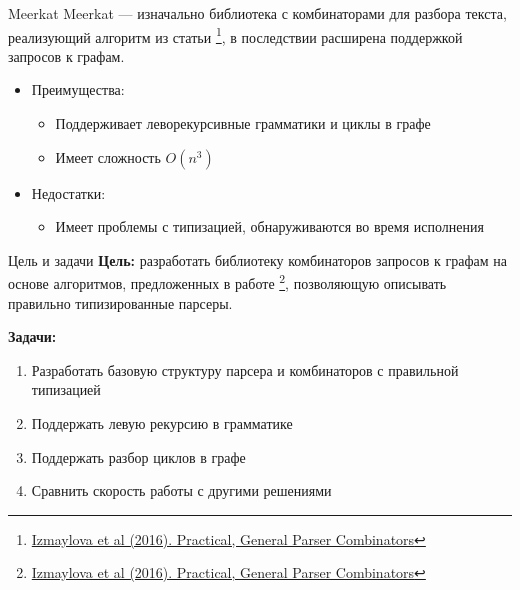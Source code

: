 \documentclass[aspectratio=169]{beamer}
\begin{document}
\begin{frame}{Meerkat}
  Meerkat --- изначально библиотека с комбинаторами для разбора текста, реализующий алгоритм из статьи \footnote{\href{https://dl.acm.org/doi/10.1145/2847538.2847539}
    {Izmaylova et al (2016). Practical, General Parser Combinators}}, в последствии расширена поддержкой запросов к графам.
  \begin{itemize}
    \item Преимущества:
          \begin{itemize}
            \item Поддерживает леворекурсивные грамматики и циклы в графе
            \item Имеет сложность $O(n^3)$
          \end{itemize}
          \vspace{0.5cm}
    \item Недостатки:
          \begin{itemize}
            \item Имеет проблемы с типизацией, обнаруживаются во время исполнения
          \end{itemize}
  \end{itemize}
\end{frame}


\begin{frame}{Цель и задачи}
  \textbf{Цель:} разработать библиотеку комбинаторов запросов к графам на основе алгоритмов, предложенных в работе \footnote[1]{\href{https://dl.acm.org/doi/10.1145/2847538.2847539}
    {Izmaylova et al (2016). Practical, General Parser Combinators}}, позволяющую описывать правильно типизированные парсеры.

  \textbf{Задачи:}
  \begin{enumerate}
    \item Разработать базовую структуру парсера и комбинаторов с правильной типизацией
    \item Поддержать левую рекурсию в грамматике
    \item Поддержать разбор циклов в графе
    \item Сравнить скорость работы с другими решениями
  \end{enumerate}
\end{frame}
\end{document}
